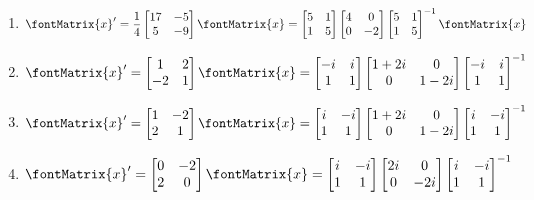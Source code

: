 \begin{enumerate}[label=(\alph*)]
\item\label{itm : Quiz19 g} $\displaystyle \fontMatrix{x}' = \frac{1}{4} \begin{bmatrix}17&-5\\5&-9\end{bmatrix} \fontMatrix{x} = \begin{bmatrix}5&1\\1&5\end{bmatrix} \begin{bmatrix}4&0\\0&-2\end{bmatrix} \begin{bmatrix}5&1\\1&5\end{bmatrix}^{-1} \fontMatrix{x}$
\item\label{itm : Quiz19 h} $\displaystyle \fontMatrix{x}' = \begin{bmatrix}1&2\\-2&1\end{bmatrix} \fontMatrix{x} = \begin{bmatrix}-i&i\\1&1\end{bmatrix} \begin{bmatrix}1 + 2 i&0\\0&1 - 2 i\end{bmatrix} \begin{bmatrix}-i&i\\1&1\end{bmatrix}^{-1}$
\item\label{itm : Quiz19 i} $\displaystyle \fontMatrix{x}' = \begin{bmatrix}1&-2\\2&1\end{bmatrix} \fontMatrix{x} = \begin{bmatrix}i&-i\\1&1\end{bmatrix} \begin{bmatrix}1 + 2 i&0\\0&1 - 2 i\end{bmatrix} \begin{bmatrix}i&-i\\1&1\end{bmatrix}^{-1}$
\item\label{itm : Quiz19 j} $\displaystyle \fontMatrix{x}' = \begin{bmatrix}0&-2\\2&0\end{bmatrix} \fontMatrix{x} = \begin{bmatrix}i&-i\\1&1\end{bmatrix} \begin{bmatrix}2 i&0\\0&-2 i\end{bmatrix} \begin{bmatrix}i&-i\\1&1\end{bmatrix}^{-1}$
\end{enumerate}

